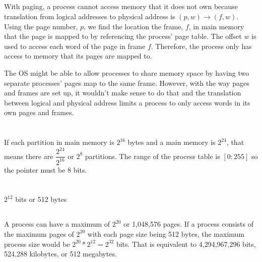 \documentclass[11pt,letterpaper]{article}
\begin{document}
		\subsection{}
			{
				\paragraph{}
				With paging, a process cannot access memory that it does not own because translation from logical addresses to physical address is $(p,w) \rightarrow (f,w)$. Using the page number, $p$, we find the location the frame, $f$, in main memory that the page is mapped to by referencing the process' page table. The offset $w$ is used to access each word of the page in frame $f$. Therefore, the process only has access to memory that its pages are mapped to.
				
				The OS might be able to allow processes to share memory space by having two separate processes' pages map to the same frame. However, with the way pages and frames are set up, it wouldn't make sense to do that and the translation between logical and physical address limits a process to only access words in its own pages and frames. 
			}
	\section{}
		\paragraph{}
		If each partition in main memory is $2^{16}$ bytes and a main memory is $2^{24}$, that means there are $\dfrac{2^{24}}{2^{16}}$ or $2^8$ partitions. The range of the process table is $[0:255]$ so the pointer must be 8 bits.
	\section{}
		\subsection{}
			\paragraph{}
			{
				$2^{12}$ bits or 512 bytes
			}
		\subsection{}
			\paragraph{}
			{
				A process can have a maximum of $2^{20}$ or 1,048,576 pages. If a process consists of the maximum pages of $2^{20}$ with each page size being 512 bytes, the maximum process size would be $2^{20} * 2^{12} = 2^{32}$ bits. That is equivalent to 4,294,967,296 bits, 524,288 kilobytes, or 512 megabytes.
			}
\end{document}
